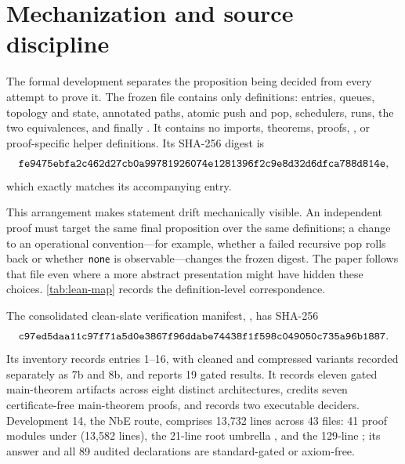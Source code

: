 \section{Mechanization and source discipline}
\label{sec:mechanization}

The formal development separates the proposition being decided from every
attempt to prove it.  The frozen file  contains only
definitions: entries, queues, topology and state, annotated paths, atomic push
and pop, schedulers, runs, the two equivalences, and finally
.  It contains no imports,
theorems, proofs, , or proof-specific helper definitions.  Its
SHA-256 digest is
\[
\texttt{fe9475ebfa2c462d27cb0a99781926074e1281396f2c9e8d32d6dfca788d814e},
\]
which exactly matches its accompanying  entry.

This arrangement makes statement drift mechanically visible.  An independent
proof must target the same final proposition over the same definitions; a
change to an operational convention---for example, whether a failed recursive
pop rolls back or whether \(\mathsf{none}\) is observable---changes the frozen digest.
The paper follows that file even where a more abstract presentation might have
hidden these choices.  \autoref{tab:lean-map} records the definition-level
correspondence.

The consolidated clean-slate verification manifest, ,
has SHA-256
\[
\texttt{c97ed5daa11c97f71a5d0e3867f96ddabe74438f1f598c049050c735a96b1887}.
\]
Its inventory records entries 1--16, with cleaned and compressed variants
recorded separately as 7b and 8b, and reports 19 gated results.  It records
eleven gated main-theorem artifacts across eight distinct architectures,
credits seven certificate-free main-theorem proofs, and records two executable
deciders.
Development 14, the NbE route, comprises 13,732 lines across 43 files:
41 proof modules under  (13,582 lines), the 21-line root
umbrella , and the 129-line ; its
answer and all 89 audited declarations are standard-gated or axiom-free.

